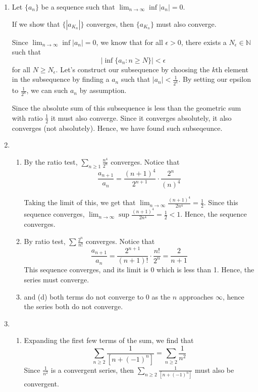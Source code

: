 \documentclass[12pt]{article}
\begin{document}

\begin{enumerate}[start=1,label={\bfseries Problem \arabic*:},leftmargin=1in] %
    \item Let $\{ a_{n} \}$ be a sequence such that $\lim_{n \to \infty} \inf |a_{n}| = 0$. 
    
    If we show that $\{ |a_{K_{n}}| \}$ converges, then $\{ a_{K_{n}} \}$ must also converge. 

    Since $\lim_{n \to \infty} \inf |a_{n}| = 0$, we know that for all $\epsilon > 0$, there exists a $N_{\epsilon} \in \mathbb{N}$ such that 
    \[ 
        \left| \inf\{ a_{n} : n \geq N\}    \right| < \epsilon
    \]
    for all $N \geq N_{\epsilon}$. Let's construct our subsequence by choosing the $k$th element in the subsequence by finding a $a_{n}$ such that $\left| a_{n} \right| < \frac{1}{2^{k}}$. 
    By setting our epsilon to $\frac{1}{2^{n}}$, we can such $a_{n}$ by assumption.

    Since the absolute sum of this subsequence is less than the geometric sum with ratio $\frac{1}{2}$ it must also converge. Since it converges absolutely, it also converges (not absolutely). Hence, we have found such subseqeunce. 
    
    \item \begin{enumerate}
        \item By the ratio test, $\sum_{n \geq 1} \frac{n^{4}}{2^{n}}$ converges. 
        Notice that 
        \[ 
        \frac{a_{n+1}}{a_{n}} = \frac{(n+1)^{4}}{2^{n+1}} \cdot \frac{2^{n}}{(n)^{4}}
        \]

        Taking the limit of this, we get that $\lim_{n \to \infty} \frac{(n+1)^{4}}{2n^{4}} = \frac{1}{2}$. Since this sequence converges, $\lim_{n \to \infty} \sup \frac{(n+1)^{4}}{2n^{4}} = \frac{1}{2} < 1$. Hence, the sequence converges. 
        \item By ratio test, $\sum \frac{2^{n}}{n!}$ converges. Notice that 
        \[ 
            \frac{a_{n+1}}{a_{n}} = \frac{2^{n+1}}{(n+1)!} \cdot \frac{n!}{2^{n}} = \frac{2}{n+1}
        \]
        This sequence converges, and its limit is 0 which is less than 1. Hence, the series must converge.

        \item and (d) both terms do not converge to 0 as the $n$ approaches $\infty$, hence the series both do not converge. 
    \end{enumerate}
    \item \begin{enumerate}
        \item Expanding the first few terms of the sum, we find that 
        \[
            \sum_{n \geq 2}\frac{1}{[n+(-1)^{n}]} = \sum_{n \geq 2} \frac{1}{n^{2}}
        \]
        Since $\frac{1}{n^{2}}$ is a convergent series, then $\sum_{n \geq 2}\frac{1}{[n+(-1)^{n}]}$ must also be convergent.


\end{enumerate}
\end{enumerate}
\end{document}
